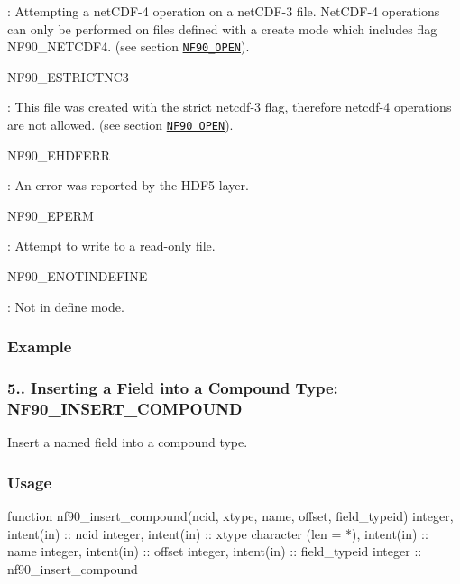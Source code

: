 \+: Attempting a net\+C\+D\+F-\/4 operation on a net\+C\+D\+F-\/3 file. Net\+C\+D\+F-\/4 operations can only be performed on files defined with a create mode which includes flag N\+F90\+\_\+\+N\+E\+T\+C\+D\+F4. (see section \href{#NF90_005fOPEN}{\tt N\+F90\+\_\+\+O\+P\+EN}).

{\ttfamily N\+F90\+\_\+\+E\+S\+T\+R\+I\+C\+T\+N\+C3}

\+: This file was created with the strict netcdf-\/3 flag, therefore netcdf-\/4 operations are not allowed. (see section \href{#NF90_005fOPEN}{\tt N\+F90\+\_\+\+O\+P\+EN}).

{\ttfamily N\+F90\+\_\+\+E\+H\+D\+F\+E\+RR}

\+: An error was reported by the H\+D\+F5 layer.

{\ttfamily N\+F90\+\_\+\+E\+P\+E\+RM}

\+: Attempt to write to a read-\/only file.

{\ttfamily N\+F90\+\_\+\+E\+N\+O\+T\+I\+N\+D\+E\+F\+I\+NE}

\+: Not in define mode.

\subsubsection*{Example}\hypertarget{f90-user-defined-data-types_f90-inserting-a-field-into-a-compound-type-nf90_insert_compound}{}\subsubsection{5.. Inserting a Field into a Compound Type\+: N\+F90\+\_\+\+I\+N\+S\+E\+R\+T\+\_\+\+C\+O\+M\+P\+O\+U\+ND}\label{f90-user-defined-data-types_f90-inserting-a-field-into-a-compound-type-nf90_insert_compound}
Insert a named field into a compound type.

\subsubsection*{Usage}


\begin{DoxyCode}
\textcolor{keyword}{function }nf90\_insert\_compound(ncid, xtype, name, offset, field\_typeid)
  \textcolor{keywordtype}{integer}, \textcolor{keywordtype}{intent(in)} :: ncid
  \textcolor{keywordtype}{integer}, \textcolor{keywordtype}{intent(in)} :: xtype
  \textcolor{keywordtype}{character (len = *)}, \textcolor{keywordtype}{intent(in)} :: name
  \textcolor{keywordtype}{integer}, \textcolor{keywordtype}{intent(in)} :: offset
  \textcolor{keywordtype}{integer}, \textcolor{keywordtype}{intent(in)} :: field\_typeid
  \textcolor{keywordtype}{integer} :: nf90\_insert\_compound
\end{DoxyCode}


